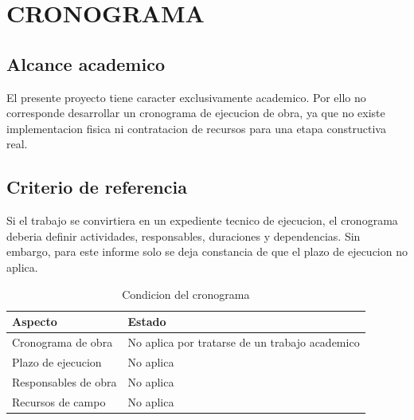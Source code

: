 \chapter{CRONOGRAMA}

\section{Alcance academico}

El presente proyecto tiene caracter exclusivamente academico. Por ello no corresponde desarrollar un cronograma de ejecucion de obra, ya que no existe implementacion fisica ni contratacion de recursos para una etapa constructiva real.

\section{Criterio de referencia}

Si el trabajo se convirtiera en un expediente tecnico de ejecucion, el cronograma deberia definir actividades, responsables, duraciones y dependencias. Sin embargo, para este informe solo se deja constancia de que el plazo de ejecucion no aplica.

\begin{table}[H]
\centering
\caption{Condicion del cronograma}
\label{tab:cronograma-no-aplica}
\begin{tabularx}{\textwidth}{p{4cm}X}
\toprule
\textbf{Aspecto} & \textbf{Estado} \\
\midrule
Cronograma de obra & No aplica por tratarse de un trabajo academico \\
Plazo de ejecucion & No aplica \\
Responsables de obra & No aplica \\
Recursos de campo & No aplica \\
\bottomrule
\end{tabularx}
\end{table}
